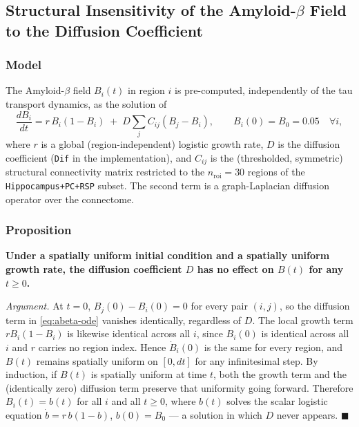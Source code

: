 
\subsection{Structural Insensitivity of the Amyloid-\texorpdfstring{$\beta$}{Beta} Field to the Diffusion Coefficient}
\label{sec:abeta-dif-inertness}

\subsubsection{Model}

The Amyloid-$\beta$ field $B_i(t)$ in region $i$ is pre-computed, independently of the tau transport dynamics, as the solution of
\begin{equation}
    \frac{dB_i}{dt} = r\, B_i (1 - B_i) \;+\; D \sum_{j} C_{ij} \left( B_j - B_i \right),
    \qquad B_i(0) = B_0 = 0.05 \quad \forall i,
    \label{eq:abeta-ode}
\end{equation}
where $r$ is a global (region-independent) logistic growth rate, $D$ is the diffusion coefficient (\texttt{Dif} in the implementation), and $C_{ij}$ is the (thresholded, symmetric) structural connectivity matrix restricted to the $n_{\mathrm{roi}} = 30$ regions of the \texttt{Hippocampus+PC+RSP} subset. The second term is a graph-Laplacian diffusion operator over the connectome.

\subsubsection{Proposition}

\textbf{Under a spatially uniform initial condition and a spatially uniform growth rate, the diffusion coefficient $D$ has no effect on $B(t)$ for any $t \geq 0$.}

\textit{Argument.} At $t=0$, $B_j(0) - B_i(0) = 0$ for every pair $(i,j)$, so the diffusion term in \eqref{eq:abeta-ode} vanishes identically, regardless of $D$. The local growth term $r B_i(1-B_i)$ is likewise identical across all $i$, since $B_i(0)$ is identical across all $i$ and $r$ carries no region index. Hence $\dot B_i(0)$ is the same for every region, and $B(t)$ remains spatially uniform on $[0, dt]$ for any infinitesimal step. By induction, if $B(t)$ is spatially uniform at time $t$, both the growth term and the (identically zero) diffusion term preserve that uniformity going forward. Therefore $B_i(t) = b(t)$ for all $i$ and all $t \geq 0$, where $b(t)$ solves the scalar logistic equation $\dot b = r\,b(1-b)$, $b(0) = B_0$ --- a solution in which $D$ never appears. $\blacksquare$

